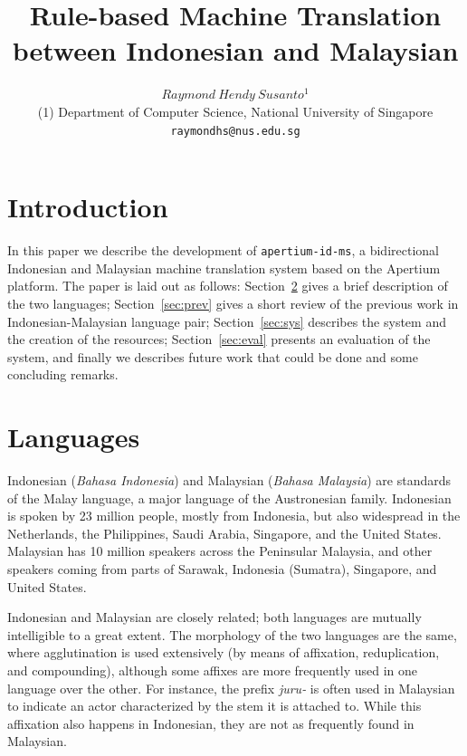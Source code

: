 \documentclass[10pt,a5paper,twoside]{article}
\title{Rule-based Machine Translation between Indonesian and Malaysian}
\author{$Raymond~Hendy~Susanto^{1}$\\
{\small  	(1) Department of Computer Science, National University of Singapore\\ 
  \texttt{raymondhs@nus.edu.sg} \\ 
}}
\begin{document}
\maketitle



\newpage
\section{Introduction}
In this paper we describe the development of \texttt{\small{apertium-id-ms}}, a bidirectional Indonesian and Malaysian machine translation system based on the Apertium platform. The paper is laid out as follows: Section~\ref{sec:lang} gives a brief description of the two languages; Section~\ref{sec:prev} gives a short review of the previous work in Indonesian-Malaysian language pair; Section~\ref{sec:sys} describes the system and the creation of the resources; Section~\ref{sec:eval} presents an evaluation of the system, and finally we describes future work that could be done and some concluding remarks.

\section{Languages}
\label{sec:lang}
Indonesian (\emph{Bahasa Indonesia}) and Malaysian (\emph{Bahasa Malaysia}) are standards of the Malay language, a major language of the Austronesian family. Indonesian is spoken by 23 million people, mostly from Indonesia, but also widespread in the Netherlands, the Philippines, Saudi Arabia, Singapore, and the United States. Malaysian has 10 million speakers across the Peninsular Malaysia, and other speakers coming from parts of Sarawak, Indonesia (Sumatra), Singapore, and United States.

Indonesian and Malaysian are closely related; both languages are mutually intelligible to a great extent. The morphology of the two languages are the same, where agglutination is used extensively (by means of affixation, reduplication, and compounding), although some affixes are more frequently used in one language over the other. For instance, the prefix \emph{juru-} is often used in Malaysian to indicate an actor characterized by the stem it is attached to. While this affixation also happens in Indonesian, they are not as frequently found in Malaysian.
\end{document}
